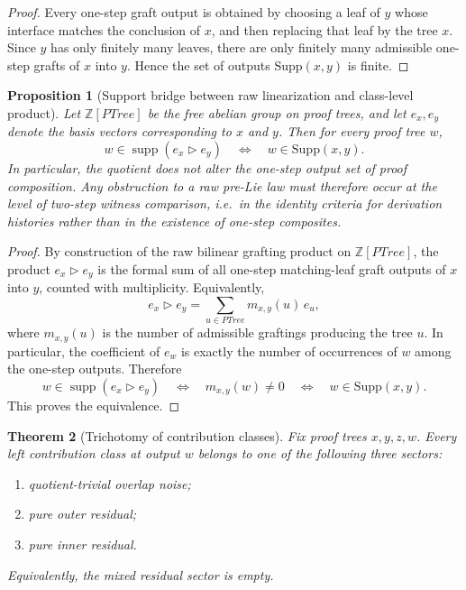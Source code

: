 \documentclass[11pt]{article}
\newtheorem{theorem}{Theorem}
\newtheorem{proposition}[theorem]{Proposition}
\newcommand{\PTree}{\mathit{PTree}}
\begin{document}
\begin{proof}
Every one-step graft output is obtained by choosing a leaf of \(y\) whose
interface matches the conclusion of \(x\), and then replacing that leaf by the
tree \(x\). Since \(y\) has only finitely many leaves, there are only finitely
many admissible one-step grafts of \(x\) into \(y\). Hence the set of outputs
\(\mathrm{Supp}(x,y)\) is finite.
\end{proof}

\begin{proposition}[Support bridge between raw linearization and class-level product]
Let \(\mathbb Z[\PTree]\) be the free abelian group on proof trees, and let
\(e_x,e_y\) denote the basis vectors corresponding to \(x\) and \(y\). Then for
every proof tree \(w\),
\[
w\in \operatorname{supp}(e_x \triangleright e_y)
\quad\Longleftrightarrow\quad
w\in \mathrm{Supp}(x,y).
\]
In particular, the quotient does not alter the \emph{one-step} output set of
proof composition.  Any obstruction to a raw pre-Lie law must therefore occur
at the level of \emph{two-step witness comparison}, i.e.\ in the identity
criteria for derivation histories rather than in the existence of one-step
composites.
\end{proposition}

\begin{proof}
By construction of the raw bilinear grafting product on \(\mathbb Z[\PTree]\),
the product \(e_x\triangleright e_y\) is the formal sum of all one-step
matching-leaf graft outputs of \(x\) into \(y\), counted with multiplicity.
Equivalently,
\[
e_x\triangleright e_y=\sum_{u\in \PTree} m_{x,y}(u)\,e_u,
\]
where \(m_{x,y}(u)\) is the number of admissible graftings producing the tree
\(u\). In particular, the coefficient of \(e_w\) is exactly the number of
occurrences of \(w\) among the one-step outputs. Therefore
\[
w\in \operatorname{supp}(e_x\triangleright e_y)
\quad\Longleftrightarrow\quad
m_{x,y}(w)\neq 0
\quad\Longleftrightarrow\quad
w\in \mathrm{Supp}(x,y).
\]
This proves the equivalence.
\end{proof}

\begin{theorem}[Trichotomy of contribution classes]
Fix proof trees \(x,y,z,w\). Every left contribution class at output \(w\)
belongs to one of the following three sectors:
\begin{enumerate}[label=\textup{(\roman*)}]
\item quotient-trivial overlap noise;
\item pure outer residual;
\item pure inner residual.
\end{enumerate}
Equivalently, the mixed residual sector is empty.
\end{theorem}
\end{document}
